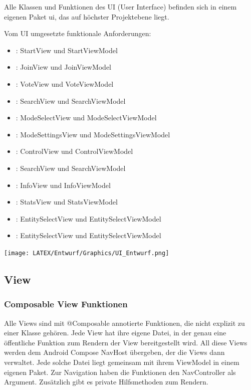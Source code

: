 \documentclass[oneside, ngerman]{sdqtechreport}
\begin{document}
Alle Klassen und Funktionen des UI (User Interface) befinden sich in einem eigenen Paket ui, das auf höchster Projektebene liegt.

Vom UI umgesetzte funktionale Anforderungen:

\begin{itemize}
    \item <F 1>: StartView und StartViewModel
    \item <F 2>: JoinView und JoinViewModel
    \item <F 3>: VoteView und VoteViewModel
    \item <F 4>: SearchView und SearchViewModel
    \item <F 5>: ModeSelectView und ModeSelectViewModel
    \item <F 6>: ModeSettingsView und ModeSettingsViewModel
    \item <F 7>: ControlView und ControlViewModel
    \item <F 8>: SearchView und SearchViewModel
    \item <F 9>: InfoView und InfoViewModel
    \item <F 10>: StatsView und StatsViewModel
    \item <F 11>: EntitySelectView und EntitySelectViewModel
    \item <F 12>: EntitySelectView und EntitySelectViewModel
\end{itemize}


\texttt{[image: LATEX/Entwurf/Graphics/UI\_Entwurf.png]}


\subsection{View}
\label{sec:App:View}


\subsubsection{Composable View Funktionen}
Alle Views sind mit @Composable annotierte Funktionen, die nicht explizit zu einer Klasse gehören. Jede View hat ihre eigene Datei, in der genau eine öffentliche Funktion zum Rendern der View bereitgestellt wird. All diese Views werden dem Android Compose NavHost übergeben, der die Views dann verwaltet. Jede solche Datei liegt gemeinsam mit ihrem ViewModel in einem eigenen Paket. Zur Navigation haben die Funktionen den NavController als Argument. Zusätzlich gibt es private Hilfsmethoden zum Rendern.
\end{document}
